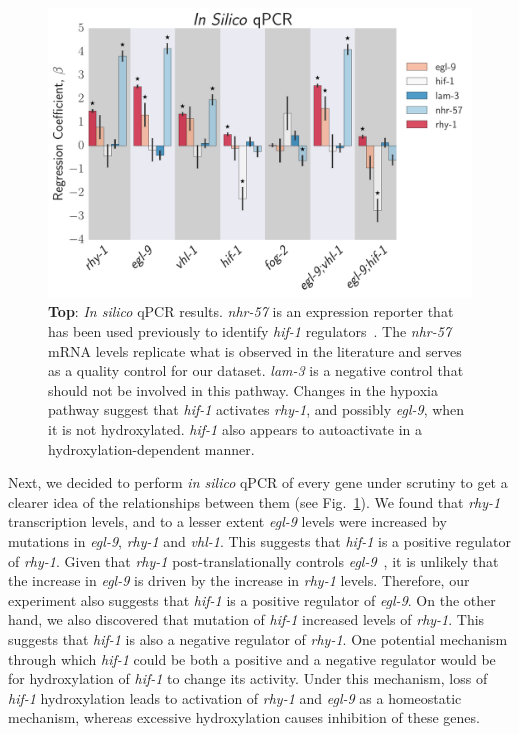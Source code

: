 \documentclass[9pt,twocolumn,twoside]{pnas-new}
\newcommand{\egl}{\emph{egl-9}}
\newcommand{\rhy}{\emph{rhy-1}}
\newcommand{\vhl}{\emph{vhl-1}}
\newcommand{\hif}{\emph{hif-1}}
\newcommand{\nhr}{\emph{nhr-57}}
\newcommand{\lam}{\emph{lam-3}}
\begin{document}
\begin{figure}[tbhp]
\centering
\includegraphics[width=\linewidth]{figs/qpcr.pdf}
\caption{\textbf{Top}: \emph{In silico} qPCR results. \nhr{} is an expression reporter that has been used previously to identify \hif{} regulators~\cite{Shen2006,Shao2009}. The \nhr{} mRNA levels replicate what is observed in the literature and serves as a quality control for our dataset. \lam{} is a negative control that should not be involved in this pathway. Changes in the hypoxia pathway suggest that \hif{} activates \rhy{}, and possibly \egl{}, when it is not hydroxylated. \hif{} also appears to autoactivate in a hydroxylation-dependent manner.}
\label{fig:qpcr}
\end{figure}

Next, we decided to perform \emph{in silico} qPCR of every gene under scrutiny to get a clearer idea of the relationships between them (see Fig.~\ref{fig:qpcr}). We found that \rhy{} transcription levels, and to a lesser extent \egl{} levels were increased by mutations in \egl{}, \rhy{} and \vhl{}. This suggests that \hif{} is a positive regulator of \rhy{}.
Given that \rhy{} post-translationally controls \egl{}~\cite{Ma2012}, it is unlikely that the increase in \egl{} is driven by the increase in \rhy{} levels. Therefore, our experiment also suggests that \hif{} is a positive regulator of \egl{}. On the other hand, we also discovered that mutation of \hif{} increased levels of \rhy{}. This suggests that \hif{} is also a negative regulator of \rhy{}. One potential mechanism through which \hif{} could be both a positive and a negative regulator would be for hydroxylation of \hif{} to change its activity. Under this mechanism, loss of \hif{} hydroxylation leads to activation of \rhy{} and \egl{} as a homeostatic mechanism, whereas excessive hydroxylation causes inhibition of these genes.
\end{document}
